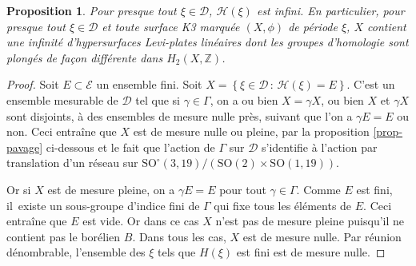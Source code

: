 \documentclass[JEP,XML,SOM,Unicode,francais,published]{cedram}
\newcommand{\Z}{\mathbb{Z}}
\newcommand{\SO}{\mathrm{SO}}
\newtheorem{prop}[thm]{Proposition}
\theoremstyle{definition}
\begin{document}
\begin{prop}\label{infinite-hlpl}
Pour presque tout $\xi \in \mathscr{D}$, $\mathscr{H}(\xi)$ est infini.
En particulier, pour presque tout $\xi \in \mathscr{D}$ et toute surface K3 marquée $(X, \phi)$ de période $\xi$, $X$ contient une infinité d'hypersurfaces Levi-plates linéaires dont les groupes d'homologie sont plongés de façon différente dans $H_2(X, \Z)$.
\end{prop}
\begin{proof}
Soit $E \subset \mathscr{E}$ un ensemble fini. Soit $X = \left\{\xi \in \mathscr{D}\,:\,\mathscr{H}(\xi) = E\right\}$. C'est un ensemble mesurable de $\mathscr{D}$ tel que si $\gamma \in \Gamma$, on a ou bien $X = \gamma X$, ou bien $X$ et $\gamma X$ sont disjoints, à des ensembles de mesure nulle près, suivant que l'on a $\gamma E = E$ ou non. Ceci entraîne que $X$ est de mesure nulle ou pleine, par la proposition \ref{prop-pavage} ci-dessous et le fait que l'action de $\Gamma$ sur $\mathscr{D}$ s'identifie à l'action par translation d'un réseau sur $\SO^\circ(3, 19)/\left(\SO(2)\times \SO(1, 19)\right)$.

Or si $X$ est de mesure pleine, on a $\gamma E = E$ pour tout $\gamma \in \Gamma$. Comme $E$ est fini, il~existe un sous-groupe d'indice fini de $\Gamma$ qui fixe tous les éléments de $E$. Ceci entraîne que $E$ est vide. Or dans ce cas $X$ n'est pas de mesure pleine puisqu'il ne contient pas le borélien $B$. Dans tous les cas, $X$ est de mesure nulle. Par réunion dénombrable, l'ensemble des $\xi$ tels que $H(\xi)$ est fini est de mesure nulle.
\end{proof}
\end{document}
